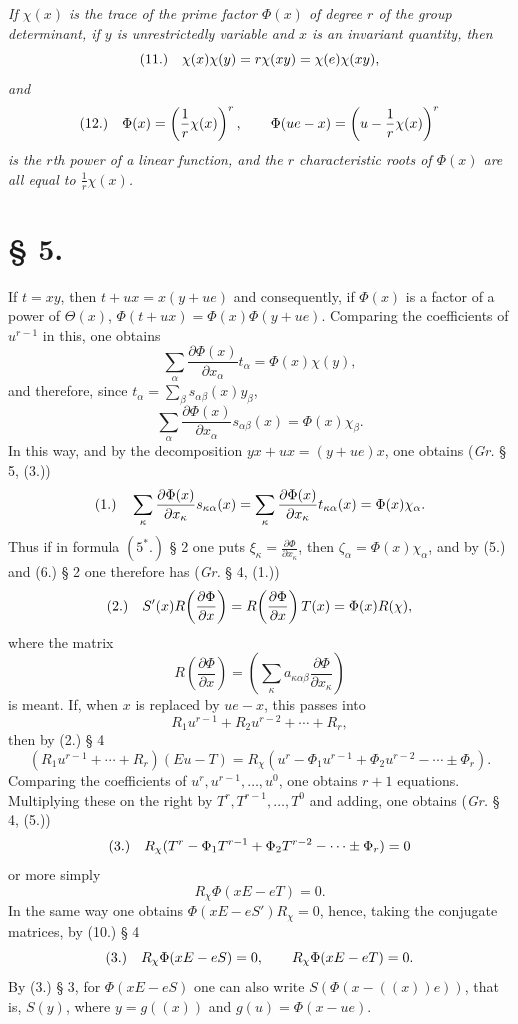 \documentclass[11pt]{article}
\newcommand{\fnum}[1]{\textup{(\ensuremath{#1}.)}\quad}
\begin{document}
\emph{If $\chi(x)$ is the trace of the prime factor $\Phi(x)$ of degree $r$ of the group determinant, if $y$ is unrestrictedly variable and $x$ is an invariant quantity, then}
\[
\fnum{11} \chi(x)\chi(y)=r\chi(xy)=\chi(e)\chi(xy),
\]
\emph{and}
\[
\fnum{12} \Phi(x)=\left(\frac1r\chi(x)\right)^r,\qquad
 \Phi(ue-x)=\left(u-\frac1r\chi(x)\right)^r
\]
\emph{is the $r$th power of a linear function, and the $r$ characteristic roots of $\Phi(x)$ are all equal to $\frac1r\chi(x)$.}

\section*{§ 5.}

If $t=xy$, then $t+ux=x(y+ue)$ and consequently, if $\Phi(x)$ is a factor of a power of $\Theta(x)$, $\Phi(t+ux)=\Phi(x)\Phi(y+ue)$. Comparing the coefficients of $u^{r-1}$ in this, one obtains
\[
 \sum_\alpha \frac{\partial\Phi(x)}{\partial x_\alpha}t_\alpha=\Phi(x)\chi(y),
\]
and therefore, since $t_\alpha=\sum_\beta s_{\alpha\beta}(x)y_\beta$,
\[
 \sum_\alpha\frac{\partial\Phi(x)}{\partial x_\alpha}s_{\alpha\beta}(x)=\Phi(x)\chi_\beta .
\]
In this way, and by the decomposition $yx+ux=(y+ue)x$, one obtains (\emph{Gr.} § 5, (3.))
\[
\fnum{1} \sum_\kappa\frac{\partial\Phi(x)}{\partial x_\kappa}s_{\kappa\alpha}(x)
=\sum_\kappa\frac{\partial\Phi(x)}{\partial x_\kappa}t_{\kappa\alpha}(x)
=\Phi(x)\chi_\alpha .
\]
Thus if in formula $(5^*.)$ § 2 one puts $\xi_\kappa=\frac{\partial\Phi}{\partial x_\kappa}$, then $\zeta_\alpha=\Phi(x)\chi_\alpha$, and by (5.) and (6.) § 2 one therefore has (\emph{Gr.} § 4, (1.))
\[
\fnum{2} S'(x)R\!\left(\frac{\partial\Phi}{\partial x}\right)
=R\!\left(\frac{\partial\Phi}{\partial x}\right)T(x)
=\Phi(x)R(\chi),
\]
where the matrix
\[
 R\!\left(\frac{\partial\Phi}{\partial x}\right)
 =\left(\sum_\kappa a_{\kappa\alpha\beta}\frac{\partial\Phi}{\partial x_\kappa}\right)
\]
is meant. If, when $x$ is replaced by $ue-x$, this passes into
\[
 R_1u^{r-1}+R_2u^{r-2}+\cdots+R_r,
\]
then by (2.) § 4
\[
 (R_1u^{r-1}+\cdots+R_r)(Eu-T)
=R_\chi(u^r-\Phi_1u^{r-1}+\Phi_2u^{r-2}-\cdots\pm\Phi_r).
\]
Comparing the coefficients of $u^r,u^{r-1},\ldots,u^0$, one obtains $r+1$ equations. Multiplying these on the right by $T^r,T^{r-1},\ldots,T^0$ and adding, one obtains (\emph{Gr.} § 4, (5.))
\[
\fnum{3} R_\chi(T^r-\Phi_1T^{r-1}+\Phi_2T^{r-2}-\cdots\pm\Phi_r)=0
\]
or more simply
\[
 R_\chi\Phi(xE-eT)=0.
\]
In the same way one obtains $\Phi(xE-eS')R_\chi=0$, hence, taking the conjugate matrices, by (10.) § 4
\[
\fnum{3} R_\chi\Phi(xE-eS)=0,\qquad R_\chi\Phi(xE-eT)=0.
\]
By (3.) § 3, for $\Phi(xE-eS)$ one can also write $S(\Phi(x-((x))e))$, that is, $S(y)$, where $y=g((x))$ and $g(u)=\Phi(x-ue)$.
\end{document}
